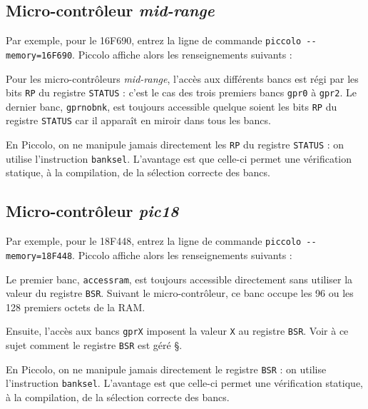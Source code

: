 \subsection{Micro-contrôleur \emph{mid-range}}

Par exemple, pour le 16F690, entrez la ligne de commande \texttt{piccolo -{}-memory=16F690}. Piccolo affiche alors les renseignements suivants :

{\footnotesize }

Pour les micro-contrôleurs \emph{mid-range}, l'accès aux différents bancs est régi par les bits \texttt{RP} du registre \texttt{STATUS} : c'est le cas des trois premiers bancs \texttt{gpr0} à \texttt{gpr2}. Le dernier banc, \texttt{gprnobnk}, est toujours accessible quelque soient les bits \texttt{RP} du registre \texttt{STATUS} car il apparaît en miroir dans tous les bancs.

En Piccolo, on ne manipule jamais directement les \texttt{RP} du registre \texttt{STATUS} : on utilise l'instruction \texttt{banksel}. L'avantage est que celle-ci permet une vérification statique, à la compilation, de la sélection correcte des bancs.


\subsection{Micro-contrôleur \emph{pic18}}

Par exemple, pour le 18F448, entrez la ligne de commande \texttt{piccolo -{}-memory=18F448}. Piccolo affiche alors les renseignements suivants :

{\footnotesize }

Le premier banc, \texttt{accessram}, est toujours accessible directement sans utiliser la valeur du registre \texttt{BSR}. Suivant le micro-contrôleur, ce banc occupe les 96 ou les 128 premiers octets de la RAM.

Ensuite, l’accès aux bancs \texttt{gprX} imposent la valeur \texttt{X} au registre \texttt{BSR}. Voir à ce sujet comment le registre \texttt{BSR} est géré §.

En Piccolo, on ne manipule jamais directement le registre \texttt{BSR} : on utilise l'instruction \texttt{banksel}. L'avantage est que celle-ci permet une vérification statique, à la compilation, de la sélection correcte des bancs.







